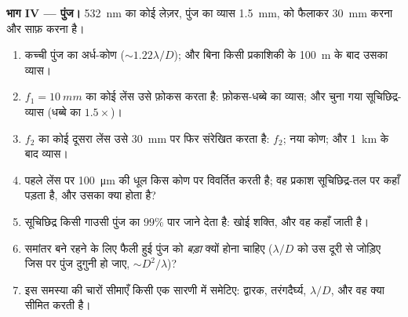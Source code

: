 \begin{problem}
\medskip
\noindent\textbf{भाग IV --- पुंज।}
\qty{532}{nm} का कोई लेज़र, पुंज का व्यास \qty{1.5}{mm}, को फैलाकर
\qty{30}{mm} करना और साफ़ करना है।
\begin{enumerate}[resume]
  \item कच्ची पुंज का  अर्ध-कोण ($\sim1.22\lambda/D$); और बिना किसी
        प्रकाशिकी के \qty{100}{m} के बाद उसका व्यास।
  \item $f_1 = \qty{10}{mm}$ का कोई लेंस उसे फ़ोकस करता है: फ़ोकस-धब्बे का व्यास;
        और चुना गया सूचिछिद्र-व्यास (धब्बे का $1.5\times$)।
  \item $f_2$ का कोई दूसरा लेंस उसे \qty{30}{mm} पर फिर संरेखित करता है: $f_2$; नया
         कोण; और \qty{1}{km} के बाद व्यास।
  \item पहले लेंस पर \qty{100}{\micro m} की धूल किस कोण पर विवर्तित करती है;
        वह प्रकाश सूचिछिद्र-तल पर कहाँ पड़ता है, और उसका क्या
        होता है?
  \item सूचिछिद्र किसी गाउसी पुंज का $99\%$ पार जाने देता है: खोई शक्ति, और
        वह कहाँ जाती है।
  \item समांतर बने रहने के लिए फैली हुई पुंज को \emph{बड़ा} क्यों होना
        चाहिए ($\lambda/D$ को उस दूरी से जोड़िए जिस पर पुंज दुगुनी हो जाए,
        $\sim D^2/\lambda$)?
  \item इस समस्या की चारों सीमाएँ किसी एक सारणी में समेटिए: द्वारक,
        तरंगदैर्घ्य, $\lambda/D$, और वह क्या सीमित करती है।
\end{enumerate}
\end{problem}
